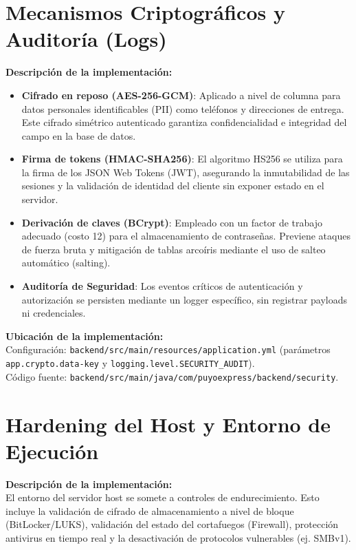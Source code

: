 \documentclass[12pt,a4paper]{article}
\begin{document}
\section{Mecanismos Criptográficos y Auditoría (Logs)}
\textbf{Descripción de la implementación:}\\
\begin{itemize}
    \item \textbf{Cifrado en reposo (AES-256-GCM)}: Aplicado a nivel de columna para datos personales identificables (PII) como teléfonos y direcciones de entrega. Este cifrado simétrico autenticado garantiza confidencialidad e integridad del campo en la base de datos.
    \item \textbf{Firma de tokens (HMAC-SHA256)}: El algoritmo HS256 se utiliza para la firma de los JSON Web Tokens (JWT), asegurando la inmutabilidad de las sesiones y la validación de identidad del cliente sin exponer estado en el servidor.
    \item \textbf{Derivación de claves (BCrypt)}: Empleado con un factor de trabajo adecuado (costo 12) para el almacenamiento de contraseñas. Previene ataques de fuerza bruta y mitigación de tablas arcoíris mediante el uso de salteo automático (salting).
    \item \textbf{Auditoría de Seguridad}: Los eventos críticos de autenticación y autorización se persisten mediante un logger específico, sin registrar payloads ni credenciales.
\end{itemize}

\noindent\textbf{Ubicación de la implementación:}\\
Configuración: \texttt{backend/src/main/resources/application.yml} (parámetros \texttt{app.crypto.data-key} y \texttt{logging.level.SECURITY\_AUDIT}).\\
Código fuente: \texttt{backend/src/main/java/com/puyoexpress/backend/security}.

\section{Hardening del Host y Entorno de Ejecución}
\textbf{Descripción de la implementación:}\\
El entorno del servidor host se somete a controles de endurecimiento. Esto incluye la validación de cifrado de almacenamiento a nivel de bloque (BitLocker/LUKS), validación del estado del cortafuegos (Firewall), protección antivirus en tiempo real y la desactivación de protocolos vulnerables (ej. SMBv1).
\end{document}

